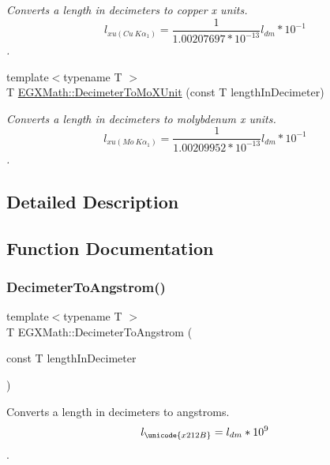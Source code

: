 \begin{DoxyCompactItemize}
\begin{DoxyCompactList}\small\item\em Converts a length in decimeters to copper x units. \[ l_{xu(Cu\ K\alpha_1)}= \frac{1}{1.00207697*10^{-13}} l_{dm} * 10^{-1}\]. \end{DoxyCompactList}\item 
{\footnotesize template$<$typename T $>$ }\\T \mbox{\hyperlink{group___e_g_x_math-_conversions-_length_conversions-_s_i-_decimeter-_non-_s_i_ga609f53e09c9a767639da3ad72905bb71}{E\+G\+X\+Math\+::\+Decimeter\+To\+Mo\+X\+Unit}} (const T length\+In\+Decimeter)
\begin{DoxyCompactList}\small\item\em Converts a length in decimeters to molybdenum x units. \[ l_{xu(Mo\ K\alpha_1)}=\frac{1}{1.00209952*10^{-13}} l_{dm} * 10^{-1}\]. \end{DoxyCompactList}\end{DoxyCompactItemize}


\subsection{Detailed Description}


\subsection{Function Documentation}
\mbox{\label{group___e_g_x_math-_conversions-_length_conversions-_s_i-_decimeter-_non-_s_i_gaffa5876e4f15bc859c369e8bfb9e4183}} 
\subsubsection{\texorpdfstring{Decimeter\+To\+Angstrom()}{DecimeterToAngstrom()}}
{\footnotesize\ttfamily template$<$typename T $>$ \\
T E\+G\+X\+Math\+::\+Decimeter\+To\+Angstrom (\begin{DoxyParamCaption}\item[{const T}]{length\+In\+Decimeter }\end{DoxyParamCaption})}



Converts a length in decimeters to angstroms. \[ l_{\unicode{x212B}}=l_{dm} * 10^{9} \]. 

